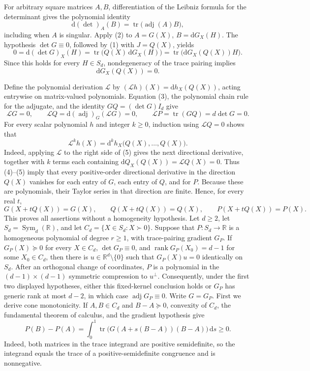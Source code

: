 For arbitrary square matrices \(A,B\), differentiation of the Leibniz formula for the determinant gives the polynomial identity
\[
 \mathrm d(\det)_A(B)=\operatorname{tr}\bigl(\operatorname{adj}(A)B\bigr), \tag{2}
\]
including when \(A\) is singular.  Apply (2) to \(A=G(X)\), \(B=\mathrm dG_X(H)\).  The hypothesis \(\det G\equiv0\), followed by (1) with \(J=Q(X)\), yields
\[
 0=\mathrm d(\det G)_X(H)
 =\operatorname{tr}\bigl(Q(X)\,\mathrm dG_X(H)\bigr)
 =\operatorname{tr}\bigl(\mathrm dG_X(Q(X))H\bigr).
\]
Since this holds for every \(H\in S_d\), nondegeneracy of the trace pairing implies
\[
 \mathrm dG_X(Q(X))=0. \tag{3}
\]

Define the polynomial derivation \(\mathcal L\) by \((\mathcal Lh)(X)=\mathrm dh_X(Q(X))\), acting entrywise on matrix-valued polynomials.  Equation (3), the polynomial chain rule for the adjugate, and the identity \(GQ=(\det G)I_d\) give
\[
 \mathcal LG=0,
 \qquad
 \mathcal LQ=\mathrm d(\operatorname{adj})_{G}(\mathcal LG)=0,
 \qquad
 \mathcal LP=\operatorname{tr}(GQ)=d\det G=0. \tag{4}
\]
For every scalar polynomial \(h\) and integer \(k\geq0\), induction using \(\mathcal LQ=0\) shows that
\[
 \mathcal L^kh(X)=\mathrm d^kh_X\bigl(Q(X),\ldots,Q(X)\bigr). \tag{5}
\]
Indeed, applying \(\mathcal L\) to the right side of (5) gives the next directional derivative, together with \(k\) terms each containing \(\mathrm dQ_X(Q(X))=\mathcal LQ(X)=0\).  Thus (4)--(5) imply that every positive-order directional derivative in the direction \(Q(X)\) vanishes for each entry of \(G\), each entry of \(Q\), and for \(P\).  Because these are polynomials, their Taylor series in that direction are finite.  Hence, for every real \(t\),
\[
 G(X+tQ(X))=G(X),
 \qquad
 Q(X+tQ(X))=Q(X),
 \qquad
 P(X+tQ(X))=P(X).
\]
This proves all assertions without a homogeneity hypothesis.
Let \(d\geq2\), let \(S_d=\operatorname{Sym}_{d}(\mathbb R)\), and let \(C_d=\{X\in S_d:X\succ0\}\).  Suppose that \(P:S_d\to\mathbb R\) is a homogeneous polynomial of degree \(r\geq1\), with trace-pairing gradient \(G_P\).  If \(G_P(X)\succeq0\) for every \(X\in C_d\), \(\det G_P\equiv0\), and \(\operatorname{rank}G_P(X_0)=d-1\) for some \(X_0\in C_d\), then there is \(u\in\mathbb R^d\setminus\{0\}\) such that \(G_P(X)u=0\) identically on \(S_d\).  After an orthogonal change of coordinates, \(P\) is a polynomial in the \((d-1)\times(d-1)\) symmetric compression to \(u^\perp\).  Consequently, under the first two displayed hypotheses, either this fixed-kernel conclusion holds or \(G_P\) has generic rank at most \(d-2\), in which case \(\operatorname{adj}G_P\equiv0\).
Write \(G=G_P\).  First we derive cone monotonicity.  If \(A,B\in C_d\) and \(B-A\succeq0\), convexity of \(C_d\), the fundamental theorem of calculus, and the gradient hypothesis give
\[
 P(B)-P(A)
 =\int_0^1\operatorname{tr}\bigl(G(A+s(B-A))(B-A)\bigr)\,\mathrm ds
 \geq0. \tag{6}
\]
Indeed, both matrices in the trace integrand are positive semidefinite, so the integrand equals the trace of a positive-semidefinite congruence and is nonnegative.

